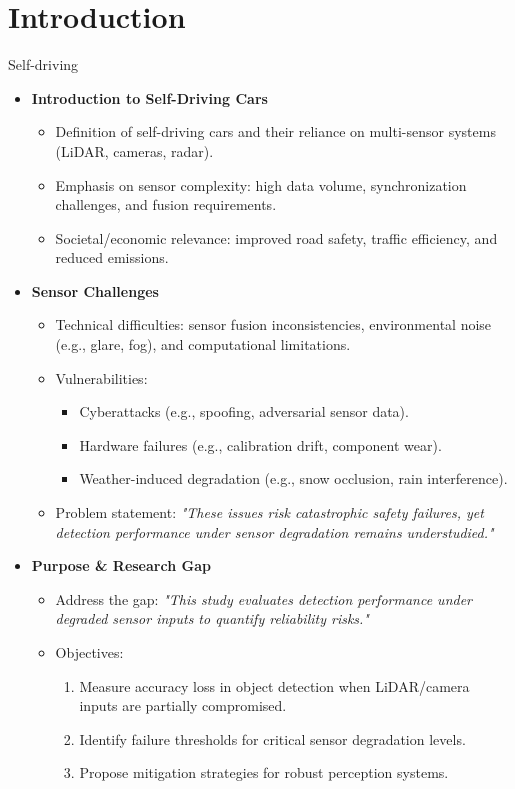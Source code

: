 \section{Introduction} \label{Introduction}

Self-driving

\begin{itemize}
    \item \textbf{Introduction to Self-Driving Cars}
    \begin{itemize}
        \item Definition of self-driving cars and their reliance on multi-sensor systems (LiDAR, cameras, radar).
        \item Emphasis on sensor complexity: high data volume, synchronization challenges, and fusion requirements.
        \item Societal/economic relevance: improved road safety, traffic efficiency, and reduced emissions.
    \end{itemize}
    
    \item \textbf{Sensor Challenges}
    \begin{itemize}
        \item Technical difficulties: sensor fusion inconsistencies, environmental noise (e.g., glare, fog), and computational limitations.
        \item Vulnerabilities: 
        \begin{itemize}
            \item Cyberattacks (e.g., spoofing, adversarial sensor data).
            \item Hardware failures (e.g., calibration drift, component wear).
            \item Weather-induced degradation (e.g., snow occlusion, rain interference).
        \end{itemize}
        \item Problem statement: \textit{"These issues risk catastrophic safety failures, yet detection performance under sensor degradation remains understudied."}
    \end{itemize}
    
    \item \textbf{Purpose \& Research Gap}
    \begin{itemize}
        \item Address the gap: \textit{"This study evaluates detection performance under degraded sensor inputs to quantify reliability risks."}
        \item Objectives:
        \begin{enumerate}
            \item Measure accuracy loss in object detection when LiDAR/camera inputs are partially compromised.
            \item Identify failure thresholds for critical sensor degradation levels.
            \item Propose mitigation strategies for robust perception systems.
        \end{enumerate}
    \end{itemize}
    

\end{itemize}
